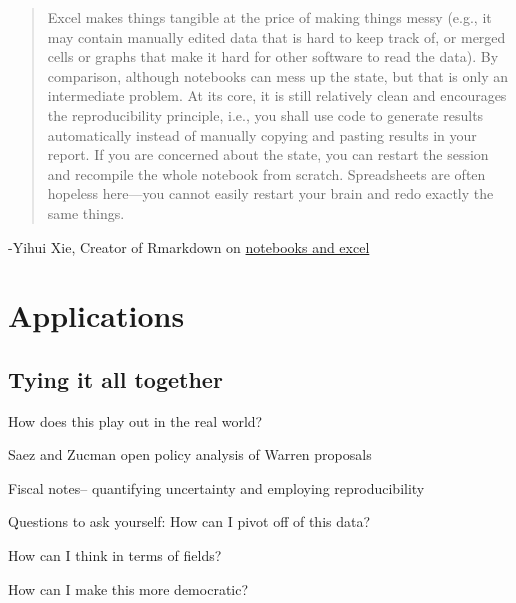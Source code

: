 \documentclass[]{book}
\begin{document}
\begin{quote}
Excel makes things tangible at the price of making things messy (e.g., it may contain manually edited data that is hard to keep track of, or merged cells or graphs that make it hard for other software to read the data). By comparison, although notebooks can mess up the state, but that is only an intermediate problem. At its core, it is still relatively clean and encourages the reproducibility principle, i.e., you shall use code to generate results automatically instead of manually copying and pasting results in your report. If you are concerned about the state, you can restart the session and recompile the whole notebook from scratch. Spreadsheets are often hopeless here---you cannot easily restart your brain and redo exactly the same things.
\end{quote}

-Yihui Xie, Creator of Rmarkdown on \href{https://yihui.org/en/2018/09/notebook-war/}{notebooks and excel}

\hypertarget{applications}{%
\chapter{Applications}\label{applications}}

\hypertarget{tying-it-all-together}{%
\section{Tying it all together}\label{tying-it-all-together}}

How does this play out in the real world?

Saez and Zucman open policy analysis of Warren proposals

Fiscal notes-- quantifying uncertainty and employing reproducibility

Questions to ask yourself:
How can I pivot off of this data?

How can I think in terms of fields?

How can I make this more democratic?


\end{document}
